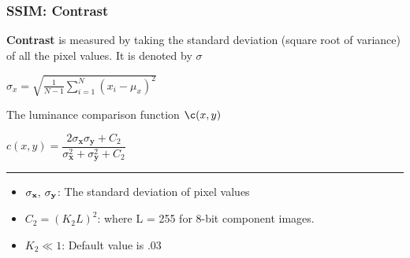 \documentclass[13.5pt,aspecratio=169, xcolor=dvipsnames]{beamer}
\begin{document}
\begin{frame}
    \onehalfspacing
        \frametitle{SSIM: Contrast}
        
        \textbf{Contrast} is measured by taking the standard deviation (square root of variance) of all the pixel values. It is denoted by $\sigma$
        \smallskip
        {\Large
        \begin{center}
            $ \sigma_x = \sqrt{\frac{1}{N-1} \sum_{i=1}^{N} (x_i - \mu_x)^2} $
        \end{center}
        }

        \begin{block}{The luminance comparison function $\c(x,y)$}
            {\Large
            \begin{center}
                $ c(x,y) = \dfrac{2\sigma_{\textbf{x}} \sigma_{\textbf{y}} + C_2}{\sigma^2_{\textbf{x}} + \sigma^2_{\textbf{y}} + C_2} $
            \end{center}
            }
            \hspace{8em}\rule{0.5\textwidth}{0.4pt}
            \begin{itemize}
                \item {\Large$\sigma_{\textbf{x}}, \hspace{0.2em} \sigma_{\textbf{y}}$}: The standard deviation of pixel values
                \item $C_2 = (K_2 L)^2$: where L = 255 for 8-bit component images.
                \item $K_2 \ll 1$: Default value is $.03$
            \end{itemize}
        \end{block}
        
        
      
\end{frame}
    
\end{document}
